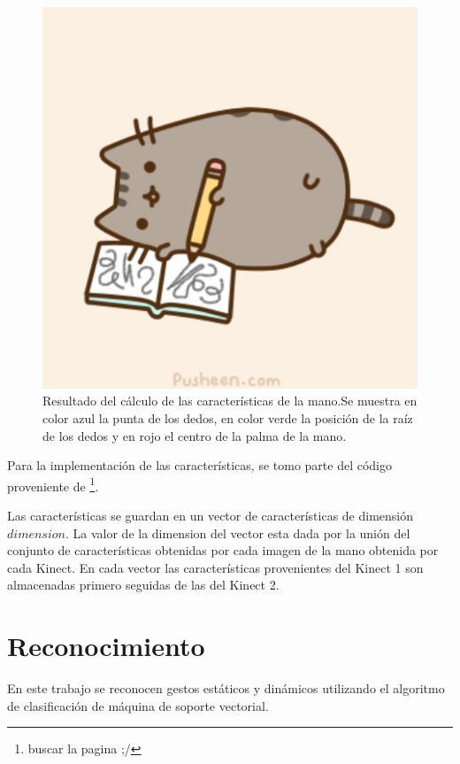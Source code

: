 \begin{figure}[h!]
\begin{center} 
\includegraphics[scale=0.6]{./Figures/pusheen.png}
\end{center}
\caption{Resultado del cálculo de las características de la mano.Se muestra en color azul la punta de los dedos, en color verde la posición de la raíz de los dedos y en rojo el centro de la palma de la mano.}
\label{fig:FeaturesOfHand}
\end{figure}

Para la implementación de las características, se tomo parte del código proveniente de \footnote{buscar la pagina ;/}. 

Las características se guardan en un vector de características de dimensión $ dimension$. La valor de la dimension del vector esta dada por la unión del conjunto de características obtenidas por cada imagen de la mano  obtenida por cada Kinect. En cada vector las características provenientes del Kinect 1 son almacenadas primero seguidas de las del Kinect 2.



\section{Reconocimiento}\label{sec:ReconocimientoSystem}

En este trabajo se reconocen gestos estáticos y dinámicos utilizando el algoritmo de clasificación de máquina de soporte vectorial.  

